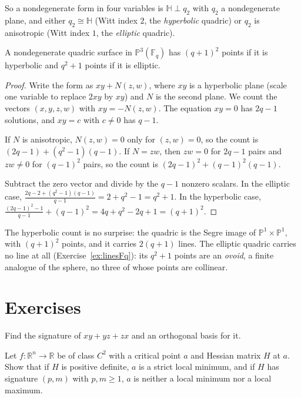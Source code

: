 So a nondegenerate form in four variables is $\mathbb H\perp q_2$ with $q_2$ a nondegenerate plane, and either $q_2\cong\mathbb H$ (Witt index $2$, the
\emph{hyperbolic} quadric) or $q_2$ is anisotropic (Witt index $1$, the \emph{elliptic} quadric).

\begin{theorem}\label{thm:countquadric}
A nondegenerate quadric surface in $\mathbb P^3(\mathbb F_q)$ has $(q+1)^2$ points if it is hyperbolic and $q^2+1$ points if it is elliptic.
\end{theorem}

\begin{proof}
Write the form as $xy+N(z,w)$, where $xy$ is a hyperbolic plane (scale one variable to replace $2xy$ by $xy$) and $N$ is the second plane. We count
the vectors $(x,y,z,w)$ with $xy=-N(z,w)$. The equation $xy=0$ has $2q-1$ solutions, and $xy=c$ with $c\ne0$ has $q-1$.

If $N$ is anisotropic, $N(z,w)=0$ only for $(z,w)=0$, so the count is $(2q-1)+(q^2-1)(q-1)$. If $N=zw$, then $zw=0$ for $2q-1$ pairs and $zw\ne0$ for
$(q-1)^2$ pairs, so the count is $(2q-1)^2+(q-1)^2(q-1)$.

Subtract the zero vector and divide by the $q-1$ nonzero scalars. In the elliptic case, $\frac{2q-2+(q^2-1)(q-1)}{q-1}=2+q^2-1=q^2+1$. In the hyperbolic case,
$\frac{(2q-1)^2-1}{q-1}+(q-1)^2=4q+q^2-2q+1=(q+1)^2$.
\end{proof}

The hyperbolic count is no surprise: the quadric is the Segre image of $\mathbb P^1\times\mathbb P^1$, with $(q+1)^2$ points, and it carries
$2(q+1)$ lines. The elliptic quadric carries no line at all (Exercise~\ref{ex:linesFq}): its $q^2+1$ points are an \emph{ovoid}, a finite analogue of
the sphere, no three of whose points are collinear.

\section{Exercises}

\begin{exercise}[$\star$]\label{ex:signxyz}
Find the signature of $xy+yz+zx$ and an orthogonal basis for it.
\end{exercise}

\begin{exercise}[$\star$]\label{ex:hessian}
Let $f:\mathbb R^n\to\mathbb R$ be of class $C^2$ with a critical point $a$ and Hessian matrix $H$ at $a$. Show that if $H$ is positive definite, $a$ is a
strict local minimum, and if $H$ has signature $(p,m)$ with $p,m\ge1$, $a$ is neither a local minimum nor a local maximum.
\end{exercise}

